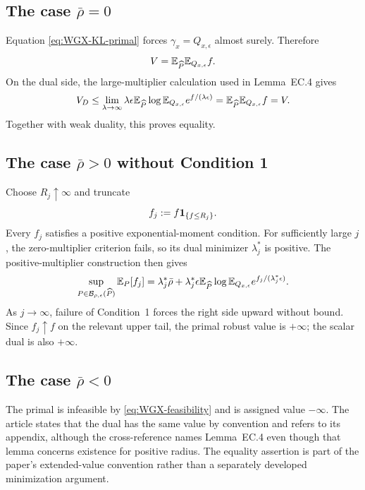 \subsection{The case $\bar\rho=0$}
Equation \eqref{eq:WGX-KL-primal} forces $\gamma_x=Q_{x,\epsilon}$ almost surely.  Therefore
\begin{equation}\label{eq:WGX-rho-zero-value}
 V=\mathbb{E}_{\widehat P}\mathbb{E}_{Q_{x,\epsilon}}f.
\end{equation}
On the dual side, the large-multiplier calculation used in Lemma~EC.4 gives
\[
 V_D\le\lim_{\lambda\to\infty}
 \lambda\epsilon\mathbb{E}_{\widehat P}
 \log\mathbb{E}_{Q_{x,\epsilon}}e^{f/(\lambda\epsilon)}
 =\mathbb{E}_{\widehat P}\mathbb{E}_{Q_{x,\epsilon}}f=V.
\]
Together with weak duality, this proves equality.

\subsection{The case $\bar\rho>0$ without Condition 1}
Choose $R_j\uparrow\infty$ and truncate
\[
 f_j:=f\mathbf{1}_{\{f\le R_j\}}.
\]
Every $f_j$ satisfies a positive exponential-moment condition.  For sufficiently large $j$, the zero-multiplier criterion fails, so its dual minimizer $\lambda_j^*$ is positive.  The positive-multiplier construction then gives
\begin{align*}
 \sup_{P\in\mathcal B_{\rho,\epsilon}(\widehat P)}\mathbb{E}_P[f_j]
 =\lambda_j^*\bar\rho
 +\lambda_j^*\epsilon\mathbb{E}_{\widehat P}
 \log\mathbb{E}_{Q_{x,\epsilon}}e^{f_j/(\lambda_j^*\epsilon)}.
\end{align*}
As $j\to\infty$, failure of Condition~1 forces the right side upward without bound.  Since $f_j\uparrow f$ on the relevant upper tail, the primal robust value is $+\infty$; the scalar dual is also $+\infty$.

\subsection{The case $\bar\rho<0$}
The primal is infeasible by \eqref{eq:WGX-feasibility} and is assigned value $-\infty$.  The article states that the dual has the same value by convention and refers to its appendix, although the cross-reference names Lemma~EC.4 even though that lemma concerns existence for positive radius.  The equality assertion is part of the paper's extended-value convention rather than a separately developed minimization argument.

